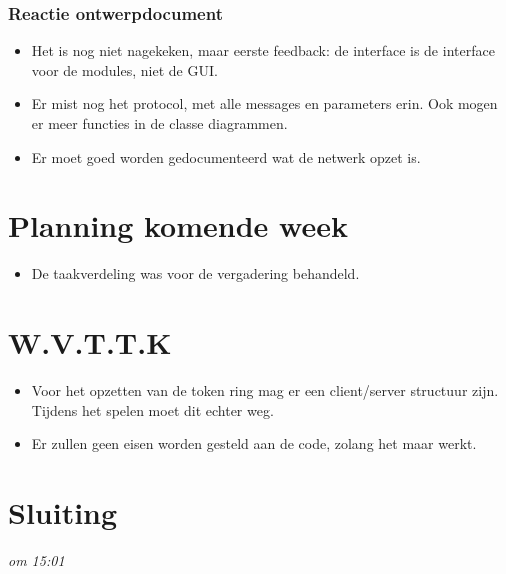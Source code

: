\documentclass[]{article}
\begin{document}
  \subsubsection{Reactie ontwerpdocument} %
  \label{ssub:reactie_specificatie}
    \begin{itemize}
      \item Het is nog niet nagekeken, maar eerste feedback: de interface is de interface voor de modules, niet de GUI.
      \item Er mist nog het protocol, met alle messages en parameters erin. Ook mogen er meer functies in de classe diagrammen.
    \item Er moet goed worden gedocumenteerd wat de netwerk opzet is.
    \end{itemize}
  

\section{Planning komende week} %
\label{sec:planning_komende_week}
  \begin{itemize}
    \item De taakverdeling was voor de vergadering behandeld.
  \end{itemize}



\section{W.V.T.T.K} %
\label{sec:w_v_t_t_k}
  \begin{itemize}
    \item Voor het opzetten van de token ring mag er een client/server structuur zijn. Tijdens het spelen moet dit echter weg.
    \item Er zullen geen eisen worden gesteld aan de code, zolang het maar werkt.
  \end{itemize}

\section{Sluiting} %
\label{sec:sluiting}
\emph{om 15:01}
\end{document}
